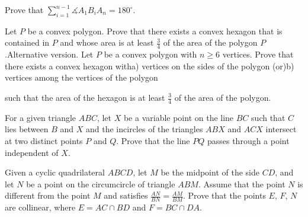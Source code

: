 Prove that $\sum_{i=1}^{n-1} \measuredangle A_1B_iA_n=180^{\circ}$.

\item[\textbf{G6.}]Let $P$ be a convex polygon. Prove that there exists a convex hexagon that is contained in $P$ and whose area is at least $\frac34$ of the area of the polygon $P$.Alternative version. Let $P$ be a convex polygon with $n\geq 6$ vertices. Prove that there exists a convex hexagon witha) vertices on the sides of the polygon (or)b) vertices among the vertices of the polygon

such that the area of the hexagon is at least $\frac{3}{4}$ of the area of the polygon.

\item[\textbf{G7.}]For a given triangle $ ABC$,  let $ X$ be a variable point on the line $ BC$ such that $ C$ lies between $ B$ and $ X$ and the incircles of the triangles $ ABX$ and $ ACX$ intersect at two distinct points $ P$ and $ Q.$ Prove that the line $ PQ$  passes through a point independent of $ X$.

\item[\textbf{G8.}]Given a cyclic quadrilateral $ABCD$,  let $M$ be the midpoint of the side $CD$,  and let $N$ be a point on the circumcircle of triangle $ABM$. Assume that the point $N$ is different from the point $M$ and satisfies $\frac{AN}{BN}=\frac{AM}{BM}$. Prove that the points $E$,  $F$,  $N$ are collinear, where $E=AC\cap BD$ and $F=BC\cap DA$.